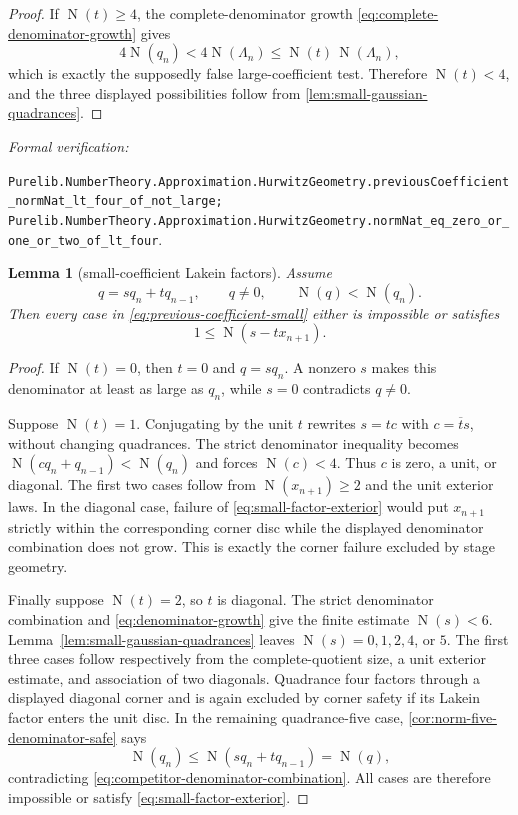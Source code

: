\documentclass[11pt]{article}
\newtheorem{lemma}[lemma]{Lemma}
\newcommand{\Norm}[1]{\operatorname{N}\!\left(#1\right)}
\newcommand{\leanref}[1]{\par\smallskip\noindent
  \emph{Formal verification:}\par\nobreak
  {\raggedright\nolinkurl{#1}.\par}}
\begin{document}
\begin{proof}
If $\Norm t\ge4$, the complete-denominator growth
\eqref{eq:complete-denominator-growth} gives
\[
 4\Norm{q_n}<4\Norm{\Lambda_n}
             \le\Norm t\,\Norm{\Lambda_n},
\]
which is exactly the supposedly false large-coefficient test.  Therefore
$\Norm t<4$, and the three displayed possibilities follow from
\cref{lem:small-gaussian-quadrances}.
\end{proof}

\leanref{Purelib.NumberTheory.Approximation.HurwitzGeometry.previousCoefficient_normNat_lt_four_of_not_large;
Purelib.NumberTheory.Approximation.HurwitzGeometry.normNat_eq_zero_or_one_or_two_of_lt_four}

\begin{lemma}[small-coefficient Lakein factors]
\label{lem:small-coefficient-factors}
Assume
\begin{equation}
\label{eq:competitor-denominator-combination}
        q=sq_n+tq_{n-1},\qquad q\ne0,\qquad \Norm q<\Norm{q_n}.
\end{equation}
Then every case in \eqref{eq:previous-coefficient-small} either is
impossible or satisfies
\begin{equation}
\label{eq:small-factor-exterior}
                         1\le\Norm{s-tx_{n+1}}.
\end{equation}
\end{lemma}

\begin{proof}
If $\Norm t=0$, then $t=0$ and $q=sq_n$.  A nonzero $s$ makes this
denominator at least as large as $q_n$, while $s=0$ contradicts $q\ne0$.

Suppose $\Norm t=1$.  Conjugating by the unit $t$ rewrites
$s=t c$ with $c=\overline t s$, without changing quadrances.  The strict
denominator inequality becomes
$\Norm{cq_n+q_{n-1}}<\Norm{q_n}$ and forces $\Norm c<4$.  Thus $c$ is zero,
a unit, or diagonal.  The first two cases follow from
$\Norm{x_{n+1}}\ge2$ and the unit exterior laws.  In the diagonal case,
failure of \eqref{eq:small-factor-exterior} would put $x_{n+1}$ strictly
within the corresponding corner disc while the displayed denominator
combination does not grow.  This is exactly the corner failure excluded by
stage geometry.

Finally suppose $\Norm t=2$, so $t$ is diagonal.  The strict denominator
combination and \eqref{eq:denominator-growth} give the finite estimate
$\Norm s<6$.  Lemma~\ref{lem:small-gaussian-quadrances} leaves
$\Norm s=0,1,2,4$, or $5$.  The first three cases follow respectively from
the complete-quotient size, a unit exterior estimate, and association of two
diagonals.  Quadrance four factors through a displayed diagonal corner and
is again excluded by corner safety if its Lakein factor enters the unit
disc.  In the remaining quadrance-five case,
\cref{cor:norm-five-denominator-safe} says
\[
                 \Norm{q_n}\le\Norm{sq_n+tq_{n-1}}=\Norm q,
\]
contradicting \eqref{eq:competitor-denominator-combination}.  All cases are
therefore impossible or satisfy \eqref{eq:small-factor-exterior}.
\end{proof}
\end{document}
